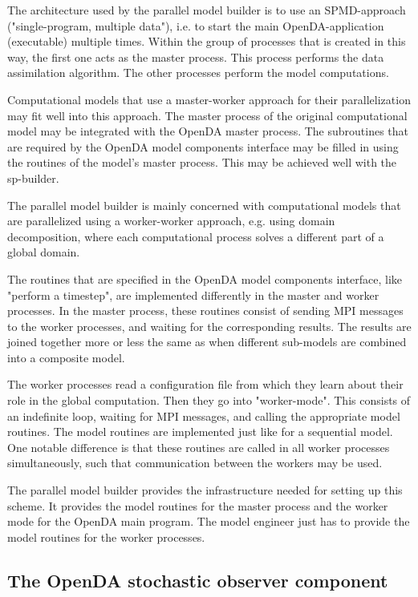 The architecture used by the parallel model builder is to use an SPMD-approach ("single-program, multiple data"), i.e. to start the main OpenDA-application (executable) multiple times. Within the group of processes that is created in this way, the first one acts as the master process. This process performs the data assimilation algorithm. The other processes perform the model computations.

Computational models that use a master-worker approach for their parallelization may fit well into this approach. The master process of the original computational model may be integrated with the OpenDA master process. The subroutines that are required by the OpenDA model components interface may be filled in using the routines of the model's master process. This may be achieved well with the sp-builder.

The parallel model builder is mainly concerned with computational models that are parallelized using a worker-worker approach, e.g. using domain decomposition, where each computational process solves a different part of a global domain.

The routines that are specified in the OpenDA model components interface, like "perform a timestep", are implemented differently in the master and worker processes. In the master process, these routines consist of sending MPI messages to the worker processes, and waiting for the corresponding results. The results are joined together more or less the same as when different sub-models are combined into a composite model.

The worker processes read a configuration file from which they learn about their role in the global computation. Then they go into "worker-mode". This consists of an indefinite loop, waiting for MPI messages, and calling the appropriate model routines. The model routines are implemented just like for a sequential model. One notable difference is that these routines are called in all worker processes simultaneously, such that communication between the workers may be used.

The parallel model builder provides the infrastructure needed for setting up this scheme. It provides the model routines for the master process and the worker mode for the OpenDA main program. The model engineer just has to provide the model routines for the worker processes.

\subsection{The OpenDA stochastic observer component}

